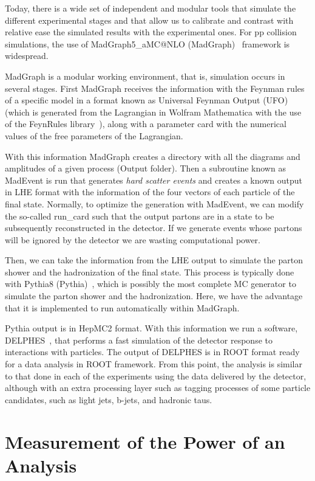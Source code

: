 Today, there is a wide set of independent and modular tools that simulate the different experimental stages and that allow us to calibrate and contrast with relative ease the simulated results with the experimental ones. For pp collision simulations, the use of MadGraph5\_aMC@NLO (MadGraph)~\parencite{Alwall_2014} framework is widespread.

MadGraph is a modular working environment, that is, simulation occurs in several stages. First MadGraph receives the information with the Feynman rules of a specific model in a format known as Universal Feynman Output (UFO) (which is generated from the Lagrangian in Wolfram Mathematica with the use of the FeynRules library~\parencite{ALLOUL20142250}), along with a parameter card with the numerical values of the free parameters of the Lagrangian. 

With this information MadGraph creates a directory with all the diagrams and amplitudes of a given process (Output folder). Then a subroutine known as MadEvent is run that generates \textit{hard scatter events} and creates a known output in LHE format with the information of the four vectors of each particle of the final state. Normally, to optimize the generation with MadEvent, we can modify the so-called run\_card such that the output partons are in a state to be subsequently reconstructed in the detector. If we generate events whose partons will be ignored by the detector we are wasting computational power. 

Then, we can take the information from the LHE output to simulate the parton shower and the hadronization of the final state. This process is typically done with Pythia8 (Pythia)~\parencite{2203.11601}, which is possibly the most complete MC generator to simulate the parton shower and the hadronization. Here, we have the advantage that it is implemented to run automatically within MadGraph. 

Pythia output is in HepMC2 format. With this information we run a software, DELPHES~\parencite{de_Favereau_2014}, that performs a fast simulation of the detector response to interactions with particles. The output of DELPHES is in ROOT format ready for a data analysis in ROOT framework. From this point, the analysis is similar to that done in each of the experiments using the data delivered by the detector, although with an extra processing layer such as tagging processes of some particle candidates, such as light jets, b-jets, and hadronic taus.

\section{Measurement of the Power of an Analysis}
\label{sec:power_analysis}

